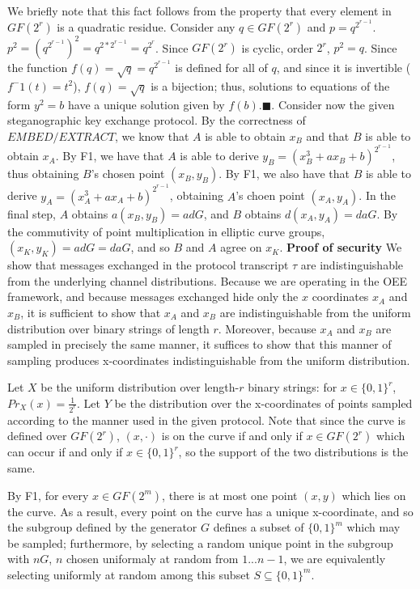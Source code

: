 \documentclass{article}
\begin{document}
We briefly note that this fact follows from the property that every element in 
$GF(2^r)$ is a quadratic residue.  Consider any $q \in GF(2^r)$ and  
$p=q^{2^{r-1}}$.  $p^2 = (q^{2^{r-1}})^2 = q^{2*2^{r-1}} = q^{2^r}$.  Since 
$GF(2^r)$ is cyclic, order $2^r$, $p^2 = q$.  Since the function 
$f(q) = \sqrt{q} = q^{2^{r-1}}$ is defined for all of $q$, and since it is invertible (
$f^-1(t) = t^2$), $f(q) = \sqrt{q}$ is a bijection; thus, solutions to equations of the form 
$y^2 = b$ have a unique solution given by $f(b)$.$\blacksquare$.
\newline\newline
Consider now the given steganographic key exchange protocol.  By the correctness of 
$EMBED/EXTRACT$, we know that $A$ is able to obtain $x_B$ and that $B$ is able to obtain 
$x_A$.  By F1, we have that $A$ is able to derive $y_B = (x_B^3 + ax_B + b)^{2^{r-1}}$, thus 
obtaining $B$'s chosen point $(x_B, y_B)$.  By F1, we also have that $B$ is able to derive
$y_A = (x_A^3 + ax_A + b)^{2^{r-1}}$, obtaining $A$'s choen point $(x_A, y_A)$.
	In the final step, $A$ obtains $a(x_B, y_B) = adG$, and $B$ obtains $d(x_A, y_A) = daG$. 
By the commutivity of point multiplication in elliptic curve groups, $(x_K, y_K) = adG = daG$, and so 
$B$ and $A$ agree on $x_K$.
\newline\newline
\noindent \textbf{Proof of security } We show that messages exchanged in the protocol transcript 
$\tau$ are indistinguishable from the underlying channel distributions.  Because we are operating in the 
OEE framework, and because messages exchanged hide only the $x$ coordinates $x_A$ and $x_B$, it 
is sufficient to show that $x_A$ and $x_B$ are indistinguishable from the uniform distribution over
binary strings of length $r$.  Moreover, because $x_A$ and $x_B$ are sampled in precisely the same manner,
it suffices to show that this manner of sampling produces x-coordinates indistinguishable from 
the uniform distribution.

Let $X$ be the uniform distribution over length-$r$ binary strings: for $x \in \{0,1\}^r$, 
$Pr_X(x) = \frac{1}{2^r}$.  Let $Y$ be the distribution over the x-coordinates of points 
sampled according to the manner used in the given protocol.  Note that since the curve 
is defined over $GF(2^r)$, $(x,\cdot)$ is on the curve if and only if $x \in GF(2^r)$ which 
can occur if and only if $x \in \{0,1\}^r$, so the support of the two distributions is the same.

By F1, for every $x \in GF(2^m)$, there is at most one point $(x,y)$ which lies on the curve. 
As a result, every point on the curve has a unique x-coordinate, and so the subgroup defined 
by the generator $G$ defines a subset of $\{0,1\}^m$ which may be sampled; furthermore, 
by selecting a random unique point in the subgroup with $nG$, $n$ chosen uniformaly at random 
from $1...n-1$, we are equivalently selecting uniformly at random among this subset $S \subseteq \{0,1\}^m$.
\end{document}
